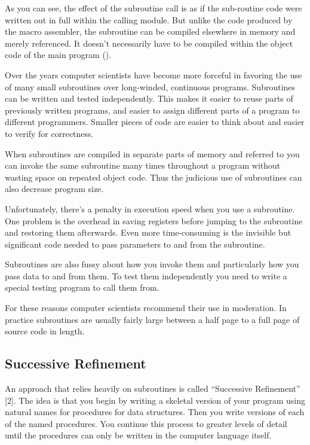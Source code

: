 As you can see, the effect of the subroutine call is as if the sub-routine
code were written out in full within the calling module. But unlike
the code produced by the macro assembler, the subroutine can be compiled
elsewhere in memory and merely referenced. It doesn't necessarily
have to be compiled within the object code of the main program ().


Over the years computer scientists have become more forceful in favoring
the use of many small subroutines over long-winded, continuous programs.
Subroutines can be written and tested independently. This makes it
easier to reuse parts of previously written programs, and easier to
assign different parts of a program to different programmers. Smaller
pieces of code are easier to think about and easier to verify for
correctness.

When subroutines are compiled in separate parts of memory and referred
to you can invoke the same subroutine many times throughout a program
without wasting space on repeated object code. Thus the judicious
use of subroutines can also decrease program size. 

Unfortunately, there's a penalty in execution speed when you use a
subroutine. One problem is the overhead in saving registers before
jumping to the subroutine and restoring them afterwards. Even more
time-consuming is the invisible but significant code needed to pass
parameters to and from the subroutine.

Subroutines are also fussy about how you invoke them and particularly
how you pass data to and from them. To test them independently you
need to write a special testing program to call them from.

For these reasons computer scientists recommend their use in moderation.
In practice subroutines are usually fairly large between a half page
to a full page of source code in length.


\subsection{Successive Refinement}

An approach that relies heavily on subroutines is called {}``Successive
Refinement'' {[}2{]}. The idea is that you begin by writing a skeletal
version of your program using natural names for procedures for data
structures. Then you write versions of each of the named procedures.
You continue this process to greater levels of detail until the procedures
can only be written in the computer language itself.

